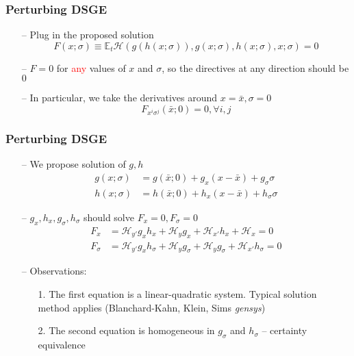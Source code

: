 \documentclass[aspectratio=169, 11pt]{beamer}
\begin{document}
\begin{frame}
\frametitle{Perturbing DSGE}
  \begin{itemize}
    \item[--] Plug in the proposed solution
    \[
      F\left(x;\sigma\right)\equiv\mathbb{E}_{t}\mathcal{H}\left(g\left(h\left(x;\sigma\right)\right),g\left(x;\sigma\right),h\left(x;\sigma\right),x;\sigma\right)=0
    \]
    \bigskip
    \item[--] $F=0$ for \textcolor{red}{any} values of $x$ and $\sigma$, so the directives at any direction should be $0$
    \bigskip
    \item[--] In particular, we take the derivatives around $x=\bar{x}, \sigma=0$
    \[
      F_{x^{i}\sigma^{j}}\left(\bar{x};0\right)=0,\forall i,j
    \]
  \end{itemize}
\end{frame}

\begin{frame}
\frametitle{Perturbing DSGE}
  \begin{itemize}
    \item[--] We propose solution of $g,h$
    \begin{align*}
      g\left(x;\sigma\right) & =g\left(\bar{x};0\right)+g_{x}\left(x-\bar{x}\right)+g_{\sigma}\sigma\\
      h\left(x;\sigma\right) & =h\left(\bar{x};0\right)+h_{x}\left(x-\bar{x}\right)+h_{\sigma}\sigma
    \end{align*}
    \bigskip
    \item[--] $g_x,h_x,g_\sigma,h_\sigma$ should solve $F_x=0,F_\sigma=0$
    \begin{align*}
      F_{x} & =\mathcal{H}_{y'}g_{x}h_{x}+\mathcal{H}_{y}g_{x}+\mathcal{H}_{x'}h_{x}+\mathcal{H}_{x}=0\\
      F_{\sigma} & =\mathcal{H}_{y'}g_{x}h_{\sigma}+\mathcal{H}_{y}g_{\sigma}+\mathcal{H}_{y}g_{\sigma}+\mathcal{H}_{x'}h_{\sigma}=0
    \end{align*}
    \bigskip
    \item[--] Observations:
    \begin{itemize}
      \item[1.] The first equation is a linear-quadratic system. Typical solution method applies (Blanchard-Kahn, Klein, Sims \textit{gensys})
      \item[2.] The second equation is homogeneous in $g_{\sigma}$ and $h_{\sigma}$ -- certainty equivalence
    \end{itemize}
  \end{itemize}
\end{frame}
\end{document}
